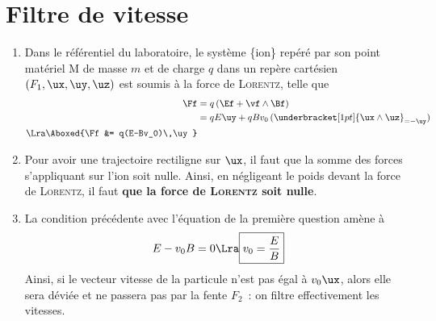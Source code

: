 \documentclass[a4paper, 12pt, final, garamond]{book}
\begin{document}
\section{Filtre de vitesse}
\begin{enumerate}
    \item Dans le référentiel du laboratoire, le système \{ion\} repéré par son
        point matériel M de masse $m$ et de charge $q$ dans un repère cartésien
        $(F_1,\ux,\uy,\uz)$ est soumis à la force de \textsc{Lorentz}, telle que
        \begin{align*}
            \Ff &= q\left(\Ef + \vf\wedge\Bf\right)
            \\
                &= qE\uy + qBv_0\,(\underbracket[1pt]{\ux\wedge\uz}_{=-\uy})
            \\\Lra
            \Aboxed{\Ff &= q(E-Bv_0)\,\uy}
        \end{align*}
    \item Pour avoir une trajectoire rectiligne sur $\ux$, il faut que la somme
        des forces s'appliquant sur l'ion soit nulle. Ainsi, en négligeant le poids
        devant la force de \textsc{Lorentz}, il faut \textbf{que la force de
        \textsc{Lorentz} soit nulle}.
    \item La condition précédente avec l'équation de la première question amène
        à
        \[E-v_0B = 0 \Lra \boxed{v_0 = \frac{E}{B}}\]
        Ainsi, si le vecteur vitesse de la particule n'est pas égal à $v_0\ux$,
        alors elle sera déviée et ne passera pas par la fente $F_2$~: on filtre
        effectivement les vitesses.
\end{enumerate}
\end{document}
